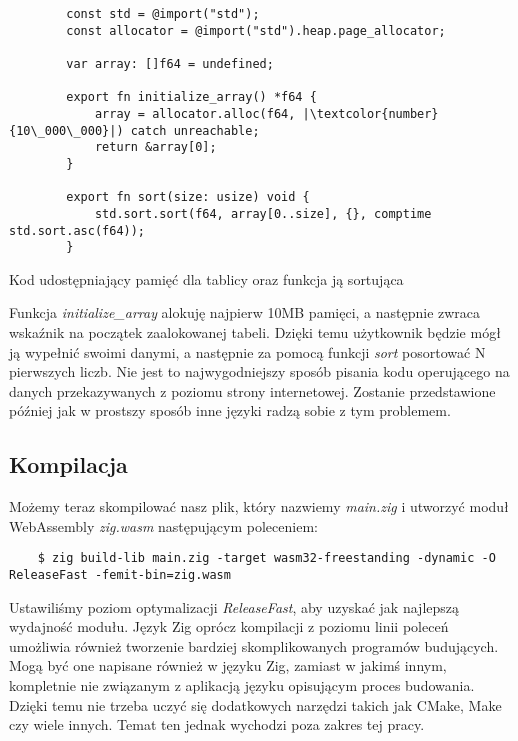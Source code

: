 \documentclass[language=polish,type=master]{aghmodern}
\begin{document}
\begin{listing}[H]
    \begin{verbatim}
        const std = @import("std");
        const allocator = @import("std").heap.page_allocator;

        var array: []f64 = undefined;

        export fn initialize_array() *f64 {
            array = allocator.alloc(f64, |\textcolor{number}{10\_000\_000}|) catch unreachable;
            return &array[0];
        }

        export fn sort(size: usize) void {
            std.sort.sort(f64, array[0..size], {}, comptime std.sort.asc(f64));
        }
    \end{verbatim}
    \caption{Kod udostępniający pamięć dla tablicy oraz funkcja ją sortująca}
\end{listing}

Funkcja \emph{initialize\_array} alokuję najpierw 10MB pamięci, a następnie zwraca wskaźnik na początek zaalokowanej tabeli.
Dzięki temu użytkownik będzie mógł ją wypełnić swoimi danymi, a następnie za pomocą funkcji \emph{sort} posortować N pierwszych liczb.
Nie jest to najwygodniejszy sposób pisania kodu operującego na danych przekazywanych z poziomu strony internetowej.
Zostanie przedstawione później jak w prostszy sposób inne języki radzą sobie z tym problemem.

\subsection{Kompilacja}
Możemy teraz skompilować nasz plik, który nazwiemy \emph{main.zig} i utworzyć moduł WebAssembly \emph{zig.wasm} następującym poleceniem:

\begin{verbatim}
    $ zig build-lib main.zig -target wasm32-freestanding -dynamic -O ReleaseFast -femit-bin=zig.wasm
\end{verbatim}

Ustawiliśmy poziom optymalizacji \emph{ReleaseFast}, aby uzyskać jak najlepszą wydajność modułu.
Język Zig oprócz kompilacji z poziomu linii poleceń umożliwia również tworzenie bardziej skomplikowanych programów budujących.
Mogą być one napisane również w języku Zig, zamiast w jakimś innym, kompletnie nie związanym z aplikacją języku opisującym proces budowania.
Dzięki temu nie trzeba uczyć się dodatkowych narzędzi takich jak CMake, Make czy wiele innych.
Temat ten jednak wychodzi poza zakres tej pracy.
\end{document}
